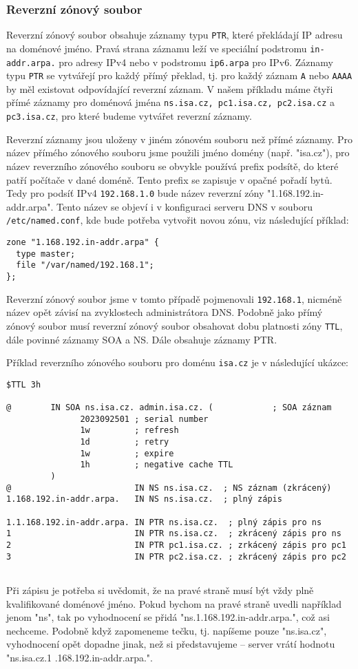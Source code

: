 \subsubsection{Reverzní zónový soubor}
Reverzní zónový soubor obsahuje záznamy typu {\tt PTR}, které překládají IP adresu na doménové jméno. Pravá strana záznamu leží ve speciální podstromu {\tt in-addr.arpa.} pro adresy IPv4 nebo v podstromu {\tt ip6.arpa} pro IPv6. Záznamy typu {\tt PTR} se vytvářejí pro každý přímý překlad, tj. pro každý záznam {\tt A} nebo {\tt AAAA} by měl existovat odpovídající reverzní záznam. V našem příkladu máme čtyři přímé záznamy pro doménová jména {\tt ns.isa.cz, pc1.isa.cz, pc2.isa.cz} a {\tt pc3.isa.cz}, pro které budeme vytvářet reverzní záznamy. 

Reverzní záznamy jsou uloženy v jiném zónovém souboru než přímé záznamy. Pro název přímého zónového souboru jsme použili jméno domény (např. "isa.cz"), pro název reverzního zónového souboru se obvykle používá prefix podsítě, do které patří počítače v dané doméně. Tento prefix se zapisuje v opačné pořadí bytů. Tedy pro podsíť IPv4 {\tt 192.168.1.0} bude název reverzní zóny "1.168.192.in-addr.arpa". Tento název se objeví i v konfiguraci serveru DNS v souboru {\tt /etc/named.conf}, kde bude potřeba vytvořit novou zónu, viz následující příklad:
\begin{verbatim}
zone "1.168.192.in-addr.arpa" {
  type master;
  file "/var/named/192.168.1";
};
\end{verbatim}        
Reverzní zónový soubor jsme v tomto případě pojmenovali {\tt 192.168.1}, nicméně název opět závisí na zvyklostech administrátora DNS. Podobně jako přímý zónový soubor musí reverzní zónový soubor obsahovat dobu platnosti zóny {\tt TTL}, dále povinné záznamy SOA a NS. Dále obsahuje záznamy PTR.

Příklad reverzního zónového souboru pro doménu {\tt isa.cz} je v následující ukázce:
\begin{verbatim}
$TTL 3h

@        IN SOA ns.isa.cz. admin.isa.cz. (            ; SOA záznam
               2023092501 ; serial number
               1w         ; refresh
               1d         ; retry 
               1w         ; expire
               1h         ; negative cache TTL
         )
@                         IN NS ns.isa.cz.  ; NS záznam (zkrácený)
1.168.192.in-addr.arpa.   IN NS ns.isa.cz.  ; plný zápis

1.1.168.192.in-addr.arpa. IN PTR ns.isa.cz.  ; plný zápis pro ns
1                         IN PTR ns.isa.cz.  ; zkrácený zápis pro ns
2                         IN PTR pc1.isa.cz. ; zrkácený zápis pro pc1
3                         IN PTR pc2.isa.cz. ; zkrácený zápis pro pc2
                    
\end{verbatim}
Při zápisu je potřeba si uvědomit, že na pravé straně musí být vždy plně kvalifikované doménové jméno. Pokud bychom na pravé straně uvedli například jenom "ns", tak po vyhodnocení se přidá "ns.1.168.192.in-addr.arpa.", což asi nechceme. Podobně když zapomeneme tečku, tj. napíšeme pouze "ns.isa.cz", vyhodnocení opět dopadne jinak, než si představujeme -- server vrátí hodnotu "ns.isa.cz.1 .168.192.in-addr.arpa.". 

